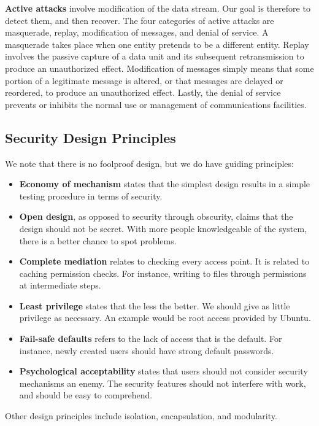 \documentclass[11pt]{article}
\theoremstyle{plain} %
\theoremstyle{definition}
\theoremstyle{example}
\theoremstyle{remark}
\begin{document}
\textbf{Active attacks} involve modification of the data stream. Our goal is therefore to detect them, and then recover. The four categories of active attacks are masquerade, replay, modification of messages, and denial of service. A masquerade takes place when one entity pretends to be a different entity. Replay involves the passive capture of a data unit and its subsequent retransmission to produce an unauthorized effect. Modification of messages simply means that some portion of a legitimate message is altered, or that messages are delayed or reordered, to produce an unauthorized effect. Lastly, the denial of service prevents or inhibits the normal use or management of communications facilities.

\subsection{Security Design Principles}

We note that there is no foolproof design, but we do have guiding principles:

\begin{itemize}
	\item \textbf{Economy of mechanism} states that the simplest design results in a simple testing procedure in terms of security. 
	\item \textbf{Open design}, as opposed to security through obscurity, claims that the design should not be secret. With more people knowledgeable of the system, there is a better chance to spot problems. 
	\item \textbf{Complete mediation} relates to checking every access point. It is related to caching permission checks. For instance, writing to files through permissions at intermediate steps. 
	
	\item \textbf{Least privilege} states that the less the better. We should give as little privilege as necessary. An example would be root access provided by Ubuntu.
	\item \textbf{Fail-safe defaults} refers to the lack of access that is the default. For instance, newly created users should have strong default passwords.
	\item \textbf{Psychological acceptability} states that users should not consider security mechanisms an enemy. The security features should not interfere with work, and should be easy to comprehend.
\end{itemize}
Other design principles include isolation, encapsulation, and modularity. 
\end{document}
